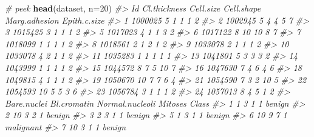 \documentclass[]{book}
\newenvironment{Shaded}{\begin{snugshade}}{\end{snugshade}}
\newcommand{\CommentTok}[1]{\textcolor[rgb]{0.56,0.35,0.01}{\textit{#1}}}
\newcommand{\DataTypeTok}[1]{\textcolor[rgb]{0.13,0.29,0.53}{#1}}
\newcommand{\DecValTok}[1]{\textcolor[rgb]{0.00,0.00,0.81}{#1}}
\newcommand{\KeywordTok}[1]{\textcolor[rgb]{0.13,0.29,0.53}{\textbf{#1}}}
\newcommand{\NormalTok}[1]{#1}
\begin{document}
\begin{Shaded}
\begin{Highlighting}[]
\CommentTok{# peek}
\KeywordTok{head}\NormalTok{(dataset, }\DataTypeTok{n=}\DecValTok{20}\NormalTok{)}
\CommentTok{#>         Id Cl.thickness Cell.size Cell.shape Marg.adhesion Epith.c.size}
\CommentTok{#> 1  1000025            5         1          1             1            2}
\CommentTok{#> 2  1002945            5         4          4             5            7}
\CommentTok{#> 3  1015425            3         1          1             1            2}
\CommentTok{#> 5  1017023            4         1          1             3            2}
\CommentTok{#> 6  1017122            8        10         10             8            7}
\CommentTok{#> 7  1018099            1         1          1             1            2}
\CommentTok{#> 8  1018561            2         1          2             1            2}
\CommentTok{#> 9  1033078            2         1          1             1            2}
\CommentTok{#> 10 1033078            4         2          1             1            2}
\CommentTok{#> 11 1035283            1         1          1             1            1}
\CommentTok{#> 13 1041801            5         3          3             3            2}
\CommentTok{#> 14 1043999            1         1          1             1            2}
\CommentTok{#> 15 1044572            8         7          5            10            7}
\CommentTok{#> 16 1047630            7         4          6             4            6}
\CommentTok{#> 18 1049815            4         1          1             1            2}
\CommentTok{#> 19 1050670           10         7          7             6            4}
\CommentTok{#> 21 1054590            7         3          2            10            5}
\CommentTok{#> 22 1054593           10         5          5             3            6}
\CommentTok{#> 23 1056784            3         1          1             1            2}
\CommentTok{#> 24 1057013            8         4          5             1            2}
\CommentTok{#>    Bare.nuclei Bl.cromatin Normal.nucleoli Mitoses     Class}
\CommentTok{#> 1            1           3               1       1    benign}
\CommentTok{#> 2           10           3               2       1    benign}
\CommentTok{#> 3            2           3               1       1    benign}
\CommentTok{#> 5            1           3               1       1    benign}
\CommentTok{#> 6           10           9               7       1 malignant}
\CommentTok{#> 7           10           3               1       1    benign}

\end{Highlighting}
\end{Shaded}
\end{document}
